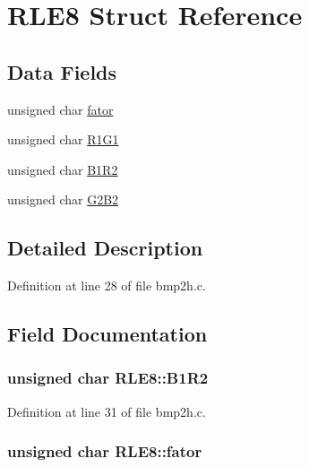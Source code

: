 \hypertarget{structRLE8}{
\section{RLE8 Struct Reference}
\label{structRLE8}
}
\subsection*{Data Fields}
\begin{DoxyCompactItemize}
\item 
unsigned char \hyperlink{structRLE8_af3c3d772184ebbd98236833adad1a816}{fator}
\item 
unsigned char \hyperlink{structRLE8_ad09dcc9b98767770301b2ca22bf70887}{R1G1}
\item 
unsigned char \hyperlink{structRLE8_ab1b9cdd6ebf9d7104ad40cb03851b955}{B1R2}
\item 
unsigned char \hyperlink{structRLE8_a1932057611d13046604349803f79c623}{G2B2}
\end{DoxyCompactItemize}


\subsection{Detailed Description}


Definition at line 28 of file bmp2h.c.



\subsection{Field Documentation}
\hypertarget{structRLE8_ab1b9cdd6ebf9d7104ad40cb03851b955}{
\subsubsection[{B1R2}]{\setlength{\rightskip}{0pt plus 5cm}unsigned char {\bf RLE8::B1R2}}}
\label{structRLE8_ab1b9cdd6ebf9d7104ad40cb03851b955}


Definition at line 31 of file bmp2h.c.

\hypertarget{structRLE8_af3c3d772184ebbd98236833adad1a816}{
\subsubsection[{fator}]{\setlength{\rightskip}{0pt plus 5cm}unsigned char {\bf RLE8::fator}}}
\label{structRLE8_af3c3d772184ebbd98236833adad1a816}


